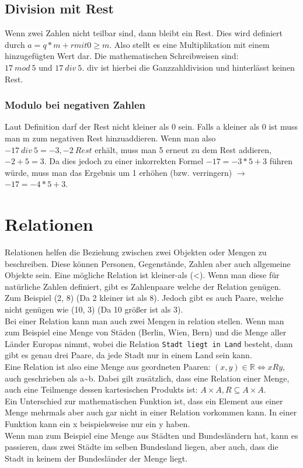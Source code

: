 \documentclass{article}
\newcommand{\R}{\mathbb{R}}
\begin{document}
	 \subsection{Division mit Rest}
	 Wenn zwei Zahlen nicht teilbar sind, dann bleibt ein Rest. Dies wird definiert durch $a=q*m+r mit 0\geq m$. Also stellt es eine Multiplikation mit einem hinzugefügten Wert dar. Die mathematischen Schreibweisen sind: \\
	 $17\ mod\ 5$ und $17\ div\ 5$. div ist hierbei die Ganzzahldivision und hinterlässt keinen Rest.
	 \subsubsection{Modulo bei negativen Zahlen}
	 Laut Definition darf der Rest nicht kleiner als 0 sein. Falls a kleiner als 0 ist muss man m zum negativen Rest hinzuaddieren. Wenn man also $-17\ div\ 5=-3, -2\ Rest$ erhält, muss man 5 erneut zu dem Rest addieren, $-2+5=3$. Da dies jedoch zu einer inkorrekten Formel $-17=-3*5+3$ führen würde, muss man das Ergebnis um 1 erhöhen (bzw. verringern) $\to$ $-17=-4*5+3$. \\
	 \section{Relationen}
	 Relationen helfen die Beziehung zwischen zwei Objekten oder Mengen zu beschreiben. Diese können Personen, Gegenstände, Zahlen aber auch allgemeine Objekte sein. Eine mögliche Relation ist kleiner-als (<). Wenn man diese für natürliche Zahlen definiert, gibt es Zahlenpaare welche der Relation genügen. Zum Beispiel (2, 8) (Da 2 kleiner ist als 8). Jedoch gibt es auch Paare, welche nicht genügen wie (10, 3) (Da 10 größer ist als 3). \\
	 Bei einer Relation kann man auch zwei Mengen in relation stellen. Wenn man zum Beispiel eine Menge von Städen (Berlin, Wien, Bern) und die Menge aller Länder Europas nimmt, wobei die Relation \verb|Stadt liegt in Land| besteht, dann gibt es genau drei Paare, da jede Stadt nur in einem Land sein kann. \\
	 Eine Relation ist also eine Menge aus geordneten Paaren: $(x,y)\in\R\iff xRy$, auch geschrieben als a\sim b. Dabei gilt zusätzlich, dass eine Relation einer Menge, auch eine Teilmenge dessen kartesischen Produkts ist: $A\times A, R \subseteq A\times A$. \\
	 Ein Unterschied zur mathematischen Funktion ist, dass ein Element aus einer Menge mehrmals aber auch gar nicht in einer Relation vorkommen kann. In einer Funktion kann ein x beispielsweise nur ein y haben. \\
	 Wenn man zum Beispiel eine Menge aus Städten und Bundesländern hat, kann es passieren, dass zwei Städte im selben Bundesland liegen, aber auch, dass die Stadt in keinem der Bundesländer der Menge liegt.
\end{document}
